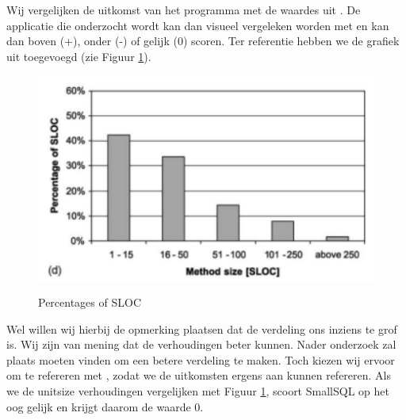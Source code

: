 \documentclass[a4paper]{article}
\begin{document}
Wij vergelijken de uitkomst van het programma met de waardes uit \cite{B}. De applicatie die onderzocht wordt kan dan visueel vergeleken worden met \cite{B} en kan dan boven (+), onder (-) of gelijk (0) scoren. Ter referentie hebben we de grafiek uit \cite{B} toegevoegd (zie Figuur \ref{fig:RefVerdeling}).
\begin{figure}[htbp]
\caption{Percentages of SLOC}
\centering
\includegraphics[width=0.6 \textwidth]{Capture.png}
\label{fig:RefVerdeling}
\end{figure}

Wel willen wij hierbij de opmerking plaatsen dat de verdeling ons inziens te grof is. Wij zijn van mening dat de verhoudingen beter kunnen. Nader onderzoek zal plaats moeten vinden om een betere verdeling te maken. Toch kiezen wij ervoor om te refereren met \cite{B}, zodat we de uitkomsten ergens aan kunnen refereren. Als we de unitsize verhoudingen vergelijken met Figuur \ref{fig:RefVerdeling}, scoort SmallSQL op het oog gelijk en krijgt daarom de waarde 0.
\end{document}
